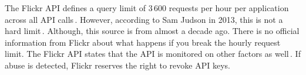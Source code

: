 The Flickr \gls{API} defines a query limit of 3\,600 requests per hour per application across all \gls{API} calls\,\cite{flickrinc.FlickrFlickrDeveloper}. However, according to Sam Judson in 2013, this is not a hard limit\,\cite{WhatAreAPI2013}. Although, this source is from almost a decade ago. There is no official information from Flickr about what happens if you break the hourly request limit. The Flickr \gls{API} states that the \gls{API} is monitored on other factors as well\,\cite{flickrinc.FlickrFlickrDeveloper}. If abuse is detected, Flickr reserves the right to revoke \gls{API} keys.